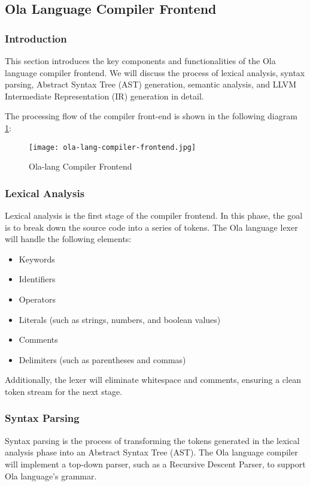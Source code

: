 \subsection{Ola Language Compiler Frontend}

\subsubsection{Introduction}
This section introduces the key components and functionalities of the Ola language compiler frontend. We will discuss the process of lexical analysis, syntax parsing, Abstract Syntax Tree (AST) generation, semantic analysis, and LLVM Intermediate Representation (IR) generation in detail.

The processing flow of the compiler front-end is shown in the following diagram \ref{fig:ola-lang-compiler-frontend}:

\begin{figure}[!ht]
    \centering
    \texttt{[image: ola-lang-compiler-frontend.jpg]}
    \caption{Ola-lang Compiler Frontend}
    \label{fig:ola-lang-compiler-frontend}
\end{figure}

\subsubsection{Lexical Analysis}
Lexical analysis is the first stage of the compiler frontend. In this phase, the goal is to break down the source code into a series of tokens. The Ola language lexer will handle the following elements:
\begin{itemize}
\item Keywords
\item Identifiers
\item Operators
\item Literals (such as strings, numbers, and boolean values)
\item Comments
\item Delimiters (such as parentheses and commas)
\end{itemize}
Additionally, the lexer will eliminate whitespace and comments, ensuring a clean token stream for the next stage.

\subsubsection{Syntax Parsing}
Syntax parsing is the process of transforming the tokens generated in the lexical analysis phase into an Abstract Syntax Tree (AST). The Ola language compiler will implement a top-down parser, such as a Recursive Descent Parser, to support Ola language's grammar.

